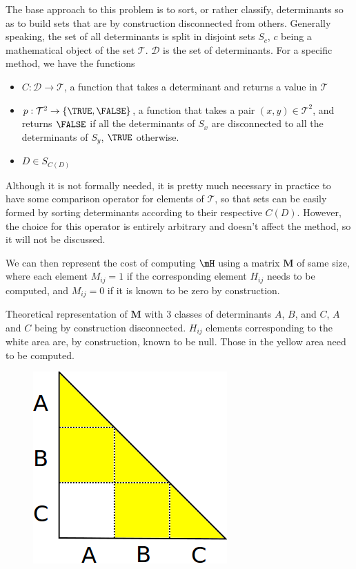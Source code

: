 The base approach to this problem is to sort, or rather classify, determinants so as to build sets that are by construction disconnected from others. Generally speaking, the set of all determinants is split in disjoint sets $S_c$, $c$ being a mathematical object of the set $\mathcal{T}$. $\mathcal{D}$ is the set of determinants. For a specific method, we have the functions
\begin{itemize}
	\item
	$C : \mathcal{D} \rightarrow \mathcal{T}$, a function that takes a determinant and returns a value in $\mathcal{T}$
	\item
	$p : \mathcal{T}^2 \rightarrow \{ \TRUE, \FALSE \}$, a function that takes a pair $(x,y) \in \mathcal{T}^2$, and returns $\FALSE$ if all the determinants of $S_x$ are disconnected to all the determinants of $S_y$, $\TRUE$ otherwise.
	\item
	$D \in S_{C(D)}$
\end{itemize}  


Although it is not formally needed, it is pretty much necessary in practice to have some comparison operator for elements of $\mathcal{T}$, so that sets can be easily formed by sorting determinants according to their respective $C(D)$. However, the choice for this operator is entirely arbitrary and doesn't affect the method, so it will not be discussed.
    
    
We can then represent the cost of computing $\mH$ using a matrix $\mathbf{M}$ of same size, where each element $M_{ij}=1$ if the corresponding element $H_{ij}$ needs to be computed, and $M_{ij}=0$ if it is known to be zero by construction.

\alert{
Theoretical representation of $\mathbf{M}$ with 3 classes of determinants $A$, $B$, and $C$, $A$ and $C$ being by construction disconnected. $H_{ij}$ elements corresponding to the white area are, by construction, known to be null. Those in the yellow area need to be computed.
}
    
\begin{figure}[h!]
	\begin{center}
		\includegraphics[width=0.4\columnwidth]{figures/davidson/disconnected_classes}
		\caption{{\label{generators_selectors}
		}}
	\end{center}
\end{figure}

